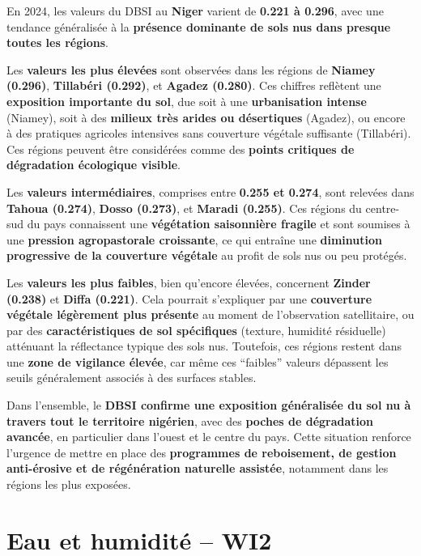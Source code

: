 \documentclass[
]{book}
\begin{document}
En 2024, les valeurs du DBSI au \textbf{Niger} varient de \textbf{0.221 à 0.296}, avec une tendance généralisée à la \textbf{présence dominante de sols nus dans presque toutes les régions}.

Les \textbf{valeurs les plus élevées} sont observées dans les régions de \textbf{Niamey (0.296)}, \textbf{Tillabéri (0.292)}, et \textbf{Agadez (0.280)}. Ces chiffres reflètent une \textbf{exposition importante du sol}, due soit à une \textbf{urbanisation intense} (Niamey), soit à des \textbf{milieux très arides ou désertiques} (Agadez), ou encore à des pratiques agricoles intensives sans couverture végétale suffisante (Tillabéri). Ces régions peuvent être considérées comme des \textbf{points critiques de dégradation écologique visible}.

Les \textbf{valeurs intermédiaires}, comprises entre \textbf{0.255 et 0.274}, sont relevées dans \textbf{Tahoua (0.274)}, \textbf{Dosso (0.273)}, et \textbf{Maradi (0.255)}. Ces régions du centre-sud du pays connaissent une \textbf{végétation saisonnière fragile} et sont soumises à une \textbf{pression agropastorale croissante}, ce qui entraîne une \textbf{diminution progressive de la couverture végétale} au profit de sols nus ou peu protégés.

Les \textbf{valeurs les plus faibles}, bien qu'encore élevées, concernent \textbf{Zinder (0.238)} et \textbf{Diffa (0.221)}. Cela pourrait s'expliquer par une \textbf{couverture végétale légèrement plus présente} au moment de l'observation satellitaire, ou par des \textbf{caractéristiques de sol spécifiques} (texture, humidité résiduelle) atténuant la réflectance typique des sols nus. Toutefois, ces régions restent dans une \textbf{zone de vigilance élevée}, car même ces ``faibles'' valeurs dépassent les seuils généralement associés à des surfaces stables.

Dans l'ensemble, le \textbf{DBSI confirme une exposition généralisée du sol nu à travers tout le territoire nigérien}, avec des \textbf{poches de dégradation avancée}, en particulier dans l'ouest et le centre du pays. Cette situation renforce l'urgence de mettre en place des \textbf{programmes de reboisement, de gestion anti-érosive et de régénération naturelle assistée}, notamment dans les régions les plus exposées.

\section{Eau et humidité -- WI2}\label{eau-et-humidituxe9-wi2}
\end{document}
